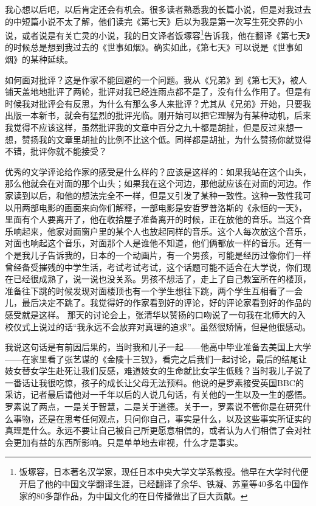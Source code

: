 \documentclass[fontset=fandol,12pt,a5paper]{ctexbook}
\begin{document}
我心想以后吧，以后肯定还会有机会。很多读者熟悉我的长篇小说，但是对我过去的中短篇小说不太了解，他们读完《第七天》后以为我是第一次写生死交界的小说，或者说是有关亡灵的小说，我的日文译者饭塚容\footnote{饭塚容，日本著名汉学家，现任日本中央大学文学系教授。他早在大学时代便开启了他的中国文学翻译生涯，已经翻译了余华、铁凝、苏童等40多名中国作家的80多部作品，为中国文化的在日传播做出了巨大贡献。}告诉我，他在翻译《第七天》的时候总是想到我过去的《世事如烟》。确实如此，《第七天》可以说是《世事如烟》的某种延续。

如何面对批评？这是作家不能回避的一个问题。我从《兄弟》到《第七天》，被人铺天盖地地批评了两轮，批评对我已经连雨点都不是了，没有什么作用了。但是有时候我对批评会有反思，为什么有那么多人来批评？尤其从《兄弟》开始，只要我出版一本新书，就会有猛烈的批评光临。刚开始可以把它理解为有某种动机，后来我觉得不应该这样，虽然批评我的文章中百分之九十都是胡扯，但是反过来想一想，赞扬我的文章里胡扯的比例不比这个低。同样都是胡扯，为什么赞扬你就觉得不错，批评你就不能接受？

优秀的文学评论给作家的感受是什么样的？应该是这样的：如果我站在这个山头，那么他就会在对面的那个山头；如果我在这个河边，那他就应该在对面的河边。作家读到以后，和他的想法完全不一样，但是又引发了某种一致性。这种一致性我可以用两部电影的画面来向你们解释，一部电影是安哲罗普洛斯的《永恒的一天》，里面有个人要离开了，他在收拾屋子准备离开的时候，正在放他的音乐。当这个音乐响起来，他家对面窗户里的某个人也放起同样的音乐。这个人每次放这个音乐，对面也响起这个音乐，对面那个人是谁他不知道，他们俩都放一样的音乐。还有一个是我儿子告诉我的，日本的一个动画片，有一个男孩，可能是经历过像你们一样曾经备受摧残的中学生活，考试考试考试，这个话题可能不适合在大学说，你们现在已经很成熟了，说一说也没关系。男孩不想活了，走上了自己教室所在的楼顶，准备往下跳的时候发现对面楼顶也有一个学生想往下跳，两个学生互相看了一会儿，最后决定不跳了。我觉得好的作家看到好的评论，好的评论家看到好的作品的感受就是这样。
那天的讨论会上，张清华以赞扬的口吻说了一句我在北师大的入校仪式上说过的话“我永远不会放弃对真理的追求”。虽然很矫情，但是他很感动。

我说这句话是有前因后果的，当时我和儿子一起——他高中毕业准备去美国上大学——在家里看了张艺谋的《金陵十三钗》，看完之后我们一起讨论，最后的结尾让妓女替女学生赴死让我们反感，难道妓女的生命就比女学生低贱？当时我儿子说了一番话让我很吃惊，孩子的成长让父母无法预料。他说的是罗素接受英国BBC的采访，记者最后请他对一千年以后的人说几句话，有关他的一生以及一生的感悟。罗素说了两点，一是关于智慧，二是关于道德。关于一，罗素说不管你是在研究什么事物，还是在思考任何观点，只问你自己，事实是什么，以及这些事实所证实的真理是什么。永远不要让自己被自己所更愿意相信的，或者认为人们相信了会对社会更加有益的东西所影响。只是单单地去审视，什么才是事实。
\end{document}
